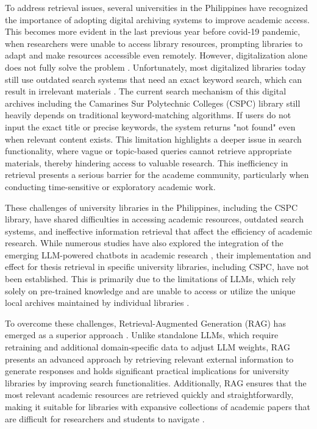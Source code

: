 \begin{refsection}
\bigbreak
\hspace{0.4cm}To address retrieval issues, several universities in the Philippines have recognized the importance of adopting digital archiving systems to improve academic access. This becomes more evident in the last previous year before covid-19 pandemic, when researchers were unable to access library resources, prompting libraries to adapt and make resources accessible even remotely. However, digitalization alone does not fully solve the problem \cite{aydin2021comparing, lagas2023challenges, prajapat2022comparative}. Unfortunately, most digitalized libraries today still use outdated search systems that need an exact keyword search, which can result in irrelevant materials \cite{setiyani2023increasing}. The current search mechanism of this digital archives including the Camarines Sur Polytechnic Colleges (CSPC) library still heavily depends on traditional keyword-matching algorithms. If users do not input the exact title or precise keywords, the system returns "not found" even when relevant content exists. This limitation highlights a deeper issue in search functionality, where vague or topic-based queries cannot retrieve appropriate materials, thereby hindering access to valuable research. This inefficiency in retrieval presents a serious barrier for the academe community,  particularly when conducting time-sensitive or exploratory academic work.

\bigbreak
\hspace{0.4cm}These challenges of university libraries in the Philippines, including the CSPC library, have shared difficulties in accessing academic resources, outdated search systems, and ineffective information retrieval that affect the efficiency of academic research. While numerous studies have also explored the integration of the emerging LLM-powered chatbots in academic research \cite{aboelmaged2024conversational}, their implementation and effect for thesis retrieval in specific university libraries, including CSPC, have not been established. This is primarily due to the limitations of LLMs, which rely solely on pre-trained knowledge and are unable to access or utilize the unique local archives maintained by individual libraries \cite{bommasani2021opportunities, strich2024improving}.

\bigbreak
\hspace{0.4cm}To overcome these challenges, Retrieval-Augmented Generation (RAG) has emerged as a superior approach \cite{lewis2020retrieval}. Unlike standalone LLMs, which require retraining and additional domain-specific data to adjust LLM weights, RAG presents an advanced approach by retrieving relevant external information to generate responses and holds significant practical implications for university libraries by improving search functionalities. Additionally, RAG ensures that the most relevant academic resources are retrieved quickly and straightforwardly, making it suitable for libraries with expansive collections of academic papers that are difficult for researchers and students to navigate \cite{wang2024mememo, huang2023retrieval}.


\end{refsection}
